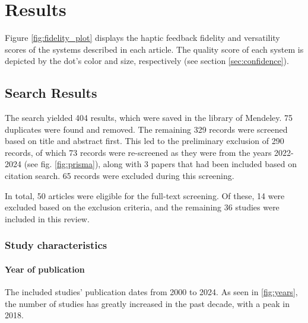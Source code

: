 \section{Results}
\label{sec:results}

Figure \ref{fig:fidelity_plot} displays the haptic feedback fidelity and versatility scores of the systems described in each article. The quality score of each system is depicted by the dot's color and size, respectively (see section \ref{sec:confidence}).


\subsection{Search Results}


The search yielded 404 results, which were saved in the library of Mendeley. 75 duplicates were found and removed. The remaining 329 records were screened based on title and abstract first. This led to the preliminary exclusion of 290 records, of which 73 records were re-screened as they were from the years 2022-2024 (see fig. \ref{fig:prisma}), along with 3 papers that had been included based on citation search. 
65 records were excluded during this screening.

In total, 50 articles were eligible for the full-text screening. Of these, 14 were excluded based on the exclusion criteria, and the remaining 36 studies were included in this review.


\subsubsection{Study characteristics}
\paragraph{Year of publication}
The included studies' publication dates from 2000 to 2024. As seen in \ref{fig:years}, the number of studies has greatly increased in the past decade, with a peak in 2018.

